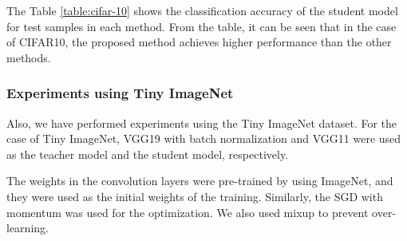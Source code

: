 \documentclass[twocolumn,10pt]{article}
\begin{document}
\begin{table}[ht]
\caption{Classification accuracy for CIFAR-10}
\label{table:cifar-10}
\begin{center}
\end{center}
\end{table}

The Table \ref{table:cifar-10} shows the classification accuracy of the student model for test samples in each method.
From the table, it can be seen that in the case of CIFAR10, the proposed method achieves higher performance than the other methods.

\thispagestyle{empty}
\subsubsection{Experiments using Tiny ImageNet}

Also, we have performed experiments using the Tiny ImageNet dataset.
For the case of Tiny ImageNet, VGG19 with batch normalization \cite{Simonyan2014, Ioffe2015} and VGG11 \cite{Simonyan2014} were used as the teacher model and the student model, respectively.

The weights in the convolution layers were pre-trained by using ImageNet, and they were used as the initial weights of the training.
Similarly, the SGD with momentum was used for the optimization.
We also used mixup \cite{Zhang2017} to prevent over-learning.


\begin{table}[ht]
\caption{Classification accuracy for Tiny ImageNet}
\label{table:imagenet}
\begin{center}
\end{center}
\end{table}
\end{document}
